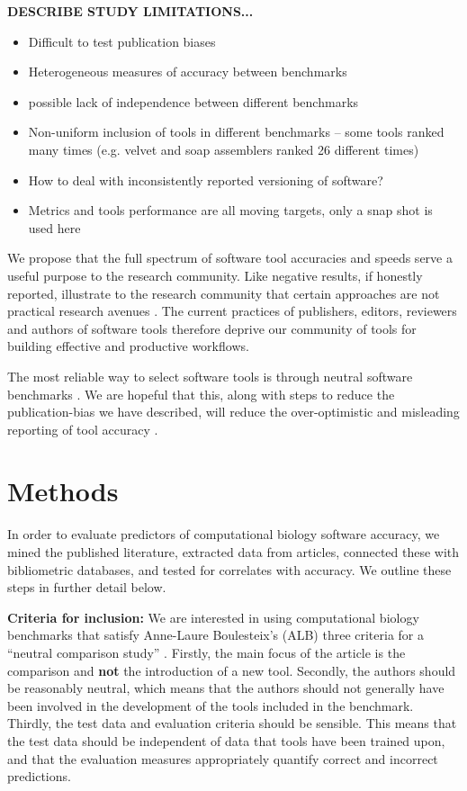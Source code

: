\documentclass[fleqn,10pt]{SelfArx} %
\begin{document}
{\bf DESCRIBE STUDY LIMITATIONS... 
\begin{itemize}
    \item Difficult to test publication biases
    \item Heterogeneous measures of accuracy between benchmarks  
    \item possible lack of independence between different benchmarks 
    \item Non-uniform inclusion of tools in different benchmarks -- some tools ranked many times (e.g. velvet and soap assemblers ranked 26 different times)
    \item How to deal with inconsistently reported versioning of software? 
    \item Metrics and tools performance are all moving targets, only a snap shot is used here  
\end{itemize}
}


We propose that the full spectrum of software tool accuracies and
speeds serve a useful purpose to the research community. Like negative
results, if honestly reported, illustrate to the research community
that certain approaches are not practical research avenues
\cite{Ioannidis2005-xh,Workman1999-au,Rivas2000-fb}.
The current
practices of publishers, editors, reviewers and authors of software
tools therefore deprive our community of tools for building effective
and productive workflows.

The most reliable way to select software tools is through neutral
software benchmarks \cite{Boulesteix2013-vb}. We are hopeful that
this, along with steps to reduce the publication-bias we have
described, will reduce the over-optimistic and misleading reporting of
tool accuracy \cite{Boulesteix2010-te,Jelizarow2010-zf,Norel2011-cq}.


\section*{Methods}
In order to evaluate predictors of computational biology software
accuracy, we mined the published literature, extracted data from
articles, connected these with bibliometric databases, and tested for
correlates with accuracy. We outline these steps in further detail
below.

\textbf{Criteria for inclusion:} We are interested in using
computational biology benchmarks that satisfy Anne-Laure Boulesteix’s
(ALB) three criteria for a “neutral comparison study”
\cite{Boulesteix2013-vb}. Firstly, the main focus of the article is
the comparison and \textbf{not} the introduction of a new
tool. Secondly, the authors should be reasonably neutral, which means
that the authors should not generally have been involved in the
development of the tools included in the benchmark. Thirdly, the test
data and evaluation criteria should be sensible. This means that the
test data should be independent of data that tools have been trained
upon, and that the evaluation measures appropriately quantify correct
and incorrect predictions.
\end{document}
